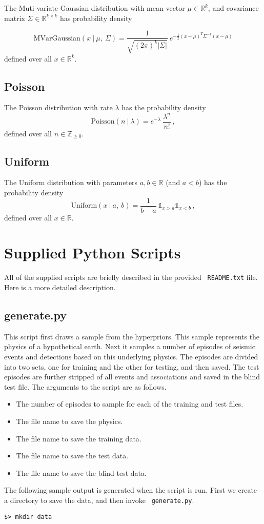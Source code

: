 \documentclass[12pt,letterpaper,onecolumn,oneside]{article}
\begin{document}
\begin{appendices}
The Muti-variate Gaussian distribution with mean vector
$\mu \in \mathbb{R}^k$, and
covariance matrix $\Sigma  \in \mathbb{R}^{k \times k}$ has probability density

\[\text{MVarGaussian}(x \ | \ \mu, \ \Sigma ) = 
\frac{1}{\sqrt{(2 \pi)^k | \Sigma
    |}} \ 
e^{ -\frac{1}{2} (x - \mu)^T \Sigma^{-1} (x - \mu)}
\]
defined over all $x \in \mathbb{R}^k$.

\subsection{Poisson}

The Poisson distribution with rate $\lambda$ has the probability density
\[ \text{Poisson}(n \ | \ \lambda) =  e ^ {-\lambda}  \ 
\frac{  \lambda ^ n  }{n !} \,
, \]
defined over all $n \in \mathbb{Z}_{\ge 0}$.

\subsection{Uniform}

The Uniform distribution with parameters $a, b \in \mathbb{R}$ (and $a <
b$) has the probability density
\[ \text{Uniform}(x \ | \ a, \ b) = \frac{1}{b - a} \ \mathbb{1}_{x>a}
\mathbb{1}_{x<b}\, ,\]
defined over all $x \in \mathbb{R}$.

\section{Supplied Python Scripts}

All of the supplied scripts are briefly described in the provided {\tt
  README.txt} file. Here is a more detailed description.

\subsection{generate.py}

This script first draws a sample from the hyperpriors. This sample
represents the physics of a hypothetical earth.  Next it samples a
number of episodes of seismic events and detections based on this
underlying physics. The episodes are divided into two sets, one for
training and the other for testing, and then saved. The test episodes
are further stripped of all events and associations and saved in the
blind test file. The arguments to the script are as follows.
\begin{itemize}
\item The number of episodes to sample for each of the training and test
  files.
\item The file name to save the physics.
\item The file name to save the training data.
\item The file name to save the test data.
\item The file name to save the blind test data.
\end{itemize}
The following sample output is generated when the script is run. First
we create a directory to save the data, and then invoke {\tt
  generate.py}.
\begin{lstlisting}
$> mkdir data


\end{lstlisting}
\end{appendices}
\end{document}
